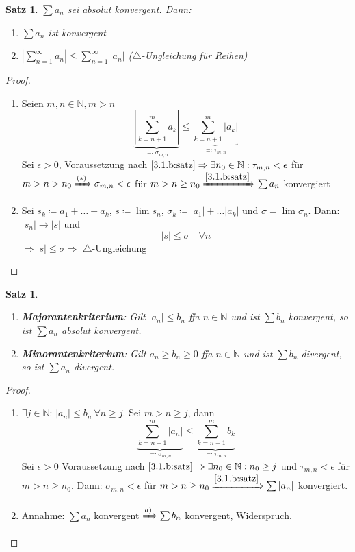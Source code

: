 \documentclass[14pt,titlepage,ngerman,a4paper,headsepline,DIV15,halfparskip*]{scrartcl}
\newcommand{\N}{\mathbb{N}}
\theoremstyle{named}
\theoremstyle{dotless}
\newtheorem{satz}[namedtheorem]{Satz}
\begin{document}
\begin{satz} \label{3.4:satz}
	$\sum a_{n}$ sei absolut konvergent. Dann:
	\begin{enumerate}
		\item $\sum a_{n}$ ist konvergent
		\item $|\sum_{n=1}^{\infty} a_{n}| \leq \sum_{n=1}^{\infty} |a_{n}|$ ($\triangle$-Ungleichung für Reihen)
	\end{enumerate}
\end{satz}

\begin{proof} ~\
	\begin{enumerate}
		\item Seien $m,n \in \N, m > n$
			\[ \underbrace{| \sum_{k = n+1}^{m} a_{k} |}_{\eqqcolon \sigma_{m, n}} \leq \underbrace{\sum_{k = n+1}^{m}|a_{k}|}_{\eqqcolon \tau_{m, n}} \tag*{$(*)$} \]
			Sei $\epsilon > 0$, Voraussetzung nach $\ref{3.1.b:satz} \Rightarrow \exists n_{0} \in \N: \tau_{m, n} < \epsilon$ für $m > n > n_{0} \xRightarrow[]{(*)} \sigma_{m, n} < \epsilon$ für $m > n \geq n_{0} \xRightarrow[]{\ref{3.1.b:satz}} \sum a_{n}$ konvergiert
		\item Sei $s_{k} \coloneqq a_{1} + \dotsc + a_{k}$, $s \coloneqq \lim s_{n}$, $\sigma_{k} \coloneqq |a_{1}| + \dotsc |a_{k}|$ und $\sigma = \lim \sigma_{n}$. Dann: $|s_{n}| \rightarrow |s|$ und 
			$$ |s| \leq \sigma \quad \forall n $$
			$\Rightarrow |s| \leq \sigma \Rightarrow$ $\triangle$-Ungleichung
	\end{enumerate}
\end{proof}

 
\begin{satz} ~\ \label{3.5:satz}
	\begin{enumerate}
		\item \textbf{Majorantenkriterium}: Gilt $|a_{n}| \leq b_{n}$ ffa $n \in \N$ und ist $\sum b_{n}$ konvergent, so ist $\sum a_{n}$ absolut konvergent. \label{3.5.a:satz}
		\item \textbf{Minorantenkriterium}: Gilt $a_{n} \geq b_{n} \geq 0$ ffa $n \in \N$ und ist $\sum b_{n}$ divergent, so ist $\sum a_{n}$ divergent. \label{3.5.b:satz}
	\end{enumerate}
\end{satz}

\begin{proof} ~\
	\begin{enumerate}
		\item $\exists j \in \N$: $|a_{n}| \leq b_{n} ~\forall n \geq j$. Sei $m > n \geq j$, dann
			\[ \underbrace{\sum_{k=n+1}^{m}|a_{n}|}_{\eqqcolon \sigma_{m, n}} \leq \underbrace{\sum_{k=n+1}^{m} b_{k}}_{\eqqcolon \tau_{m,n}}  \]
			Sei $\epsilon > 0$ Voraussetzung nach $\ref{3.1.b:satz} \Rightarrow \exists n_{0} \in \N: n_{0} \geq j$ und $\tau_{m,n} < \epsilon$ für $m > n \geq n_{0}$. Dann: $\sigma_{m,n} < \epsilon$ für $m > n \geq n_{0} \xRightarrow[]{\ref{3.1.b:satz}} \sum |a_{n}|$ konvergiert.
		\item Annahme: $\sum a_{n}$ konvergent $\xRightarrow[]{a)} \sum b_{n}$ konvergent, Widerspruch.
	\end{enumerate}	
\end{proof}
\end{document}
